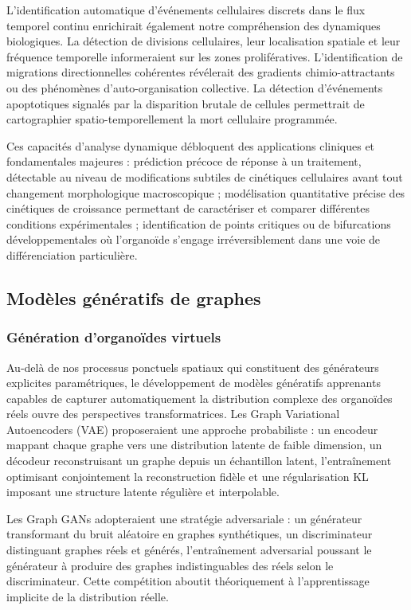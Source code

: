 L'identification automatique d'événements cellulaires discrets dans le flux temporel continu enrichirait également notre compréhension des dynamiques biologiques. La détection de divisions cellulaires, leur localisation spatiale et leur fréquence temporelle informeraient sur les zones prolifératives. L'identification de migrations directionnelles cohérentes révélerait des gradients chimio-attractants ou des phénomènes d'auto-organisation collective. La détection d'événements apoptotiques signalés par la disparition brutale de cellules permettrait de cartographier spatio-temporellement la mort cellulaire programmée.

Ces capacités d'analyse dynamique débloquent des applications cliniques et fondamentales majeures : prédiction précoce de réponse à un traitement, détectable au niveau de modifications subtiles de cinétiques cellulaires avant tout changement morphologique macroscopique ; modélisation quantitative précise des cinétiques de croissance permettant de caractériser et comparer différentes conditions expérimentales ; identification de points critiques ou de bifurcations développementales où l'organoïde s'engage irréversiblement dans une voie de différenciation particulière.

\subsection{Modèles génératifs de graphes}

\subsubsection{Génération d'organoïdes virtuels}

Au-delà de nos processus ponctuels spatiaux qui constituent des générateurs explicites paramétriques, le développement de modèles génératifs apprenants capables de capturer automatiquement la distribution complexe des organoïdes réels ouvre des perspectives transformatrices. Les Graph Variational Autoencoders (VAE) proposeraient une approche probabiliste : un encodeur mappant chaque graphe vers une distribution latente de faible dimension, un décodeur reconstruisant un graphe depuis un échantillon latent, l'entraînement optimisant conjointement la reconstruction fidèle et une régularisation KL imposant une structure latente régulière et interpolable.

Les Graph GANs adopteraient une stratégie adversariale : un générateur transformant du bruit aléatoire en graphes synthétiques, un discriminateur distinguant graphes réels et générés, l'entraînement adversarial poussant le générateur à produire des graphes indistinguables des réels selon le discriminateur. Cette compétition aboutit théoriquement à l'apprentissage implicite de la distribution réelle.


